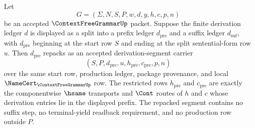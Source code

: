 \begin{theorem}
\label{thm:contextfreegrammar-derivation-prefix-carrier}
Let
$$
G=(\Sigma,N,S,P,w,d,y,h,c,p,n)
$$
be an accepted $\ContextFreeGrammarUp$ packet. Suppose the finite derivation
ledger $d$ is displayed as a split into a prefix ledger $d_{\mathrm{pre}}$ and
a suffix ledger $d_{\mathrm{suf}}$, with $d_{\mathrm{pre}}$ beginning at the
start row $S$ and ending at the split sentential-form row $u$. Then
$d_{\mathrm{pre}}$ repacks as an accepted derivation-segment carrier
$$
(S,P,d_{\mathrm{pre}},u,h_{\mathrm{pre}},c_{\mathrm{pre}},p,n)
$$
over the same start row, production ledger, package provenance, and local
$\NameCert_{\ContextFreeGrammarUp}$ row. The restricted rows
$h_{\mathrm{pre}}$ and $c_{\mathrm{pre}}$ are exactly the componentwise
$\hsame$ transports and $\Cont$ routes of $h$ and $c$ whose derivation entries
lie in the displayed prefix. The repacked segment contains no suffix step, no
terminal-yield readback requirement, and no production row outside $P$.
\end{theorem}

